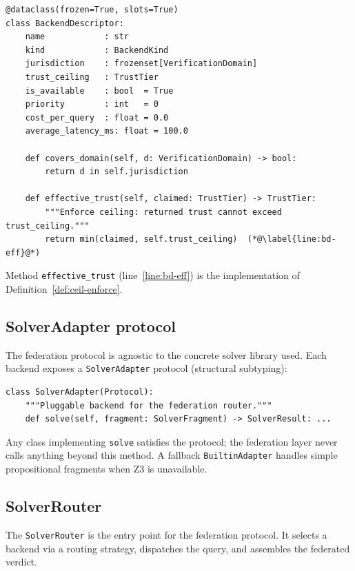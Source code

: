 \documentclass[11pt]{article}
\begin{document}
\begin{lstlisting}[style=jugeo-python, caption={%
  \texttt{BackendDescriptor} (condensed from
  \texttt{src/jugeo/solver/router.py}).}]
@dataclass(frozen=True, slots=True)
class BackendDescriptor:
    name            : str
    kind            : BackendKind
    jurisdiction    : frozenset[VerificationDomain]
    trust_ceiling   : TrustTier
    is_available    : bool  = True
    priority        : int   = 0
    cost_per_query  : float = 0.0
    average_latency_ms: float = 100.0

    def covers_domain(self, d: VerificationDomain) -> bool:
        return d in self.jurisdiction

    def effective_trust(self, claimed: TrustTier) -> TrustTier:
        """Enforce ceiling: returned trust cannot exceed trust_ceiling."""
        return min(claimed, self.trust_ceiling)  (*@\label{line:bd-eff}@*)
\end{lstlisting}

Method \texttt{effective\_trust} (line~\ref{line:bd-eff}) is the
implementation of Definition~\ref{def:ceil-enforce}.

\subsection{SolverAdapter protocol}

The federation protocol is agnostic to the concrete solver library used.
Each backend exposes a \texttt{SolverAdapter} \Python{} protocol
(structural subtyping):

\begin{lstlisting}[style=jugeo-python, caption={%
  \texttt{SolverAdapter} protocol (from
  \texttt{src/jugeo/solver/z3\_session.py}).}]
class SolverAdapter(Protocol):
    """Pluggable backend for the federation router."""
    def solve(self, fragment: SolverFragment) -> SolverResult: ...
\end{lstlisting}

Any class implementing \texttt{solve} satisfies the protocol; the
federation layer never calls anything beyond this method.  A fallback
\texttt{BuiltinAdapter} handles simple propositional fragments when Z3 is
unavailable.

\subsection{SolverRouter}

The \texttt{SolverRouter} is the entry point for the federation protocol.
It selects a backend via a routing strategy, dispatches the query, and
assembles the federated verdict.
\end{document}
